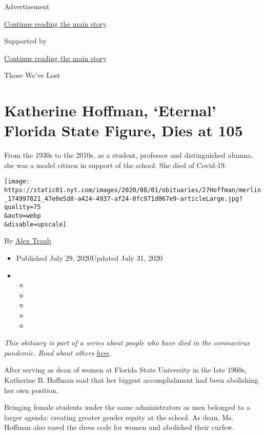 Advertisement

\protect\hyperlink{after-top}{Continue reading the main story}

Supported by

\protect\hyperlink{after-sponsor}{Continue reading the main story}

Those We've Lost

\hypertarget{katherine-hoffman-eternal-florida-state-figure-dies-at-105}{%
\section{Katherine Hoffman, `Eternal' Florida State Figure, Dies at
105}\label{katherine-hoffman-eternal-florida-state-figure-dies-at-105}}

From the 1930s to the 2010s, as a student, professor and distinguished
alumna, she was a model citizen in support of the school. She died of
Covid-19.

\texttt{[image: https://static01.nyt.com/images/2020/08/01/obituaries/27Hoffman/merlin\_174997821\_47e0e5d8-a424-4937-af24-0fc971d067e9-articleLarge.jpg?quality=75\\\&auto=webp\\\&disable=upscale]}

By \href{https://www.nytimes.com/by/alex-traub}{Alex Traub}

\begin{itemize}
\item
  Published July 29, 2020Updated July 31, 2020
\item
  \begin{itemize}
  \item
  \item
  \item
  \item
  \item
  \end{itemize}
\end{itemize}

\emph{This obituary is part of a series about people who have died in
the coronavirus pandemic. Read about others}
\href{https://www.nytimes.com/interactive/2020/obituaries/people-died-coronavirus-obituaries.html}{\emph{here}}\emph{.}

After serving as dean of women at Florida State University in the late
1960s, Katherine B. Hoffman said that her biggest accomplishment had
been abolishing her own position.

Bringing female students under the same administrators as men belonged
to a larger agenda: creating greater gender equity at the school. As
dean, Ms. Hoffman also eased the dress code for women and abolished
their curfew.

